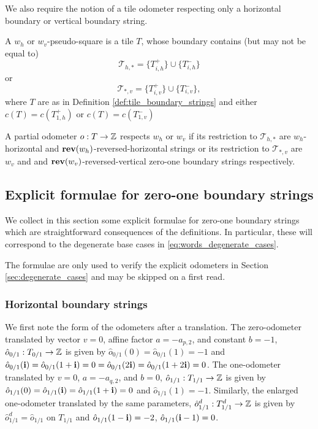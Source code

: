 \documentclass[12pt]{amsart}
\begin{document}
We also require the notion of a tile odometer respecting only a horizontal boundary or vertical boundary string.
\begin{definition} \label{def:partial_tile_boundary_strings}
	A $w_{h}$ or $w_v$-pseudo-square is a tile $T$, whose boundary contains (but may not be equal to)
	\[
	\mathcal{T}_{h,*} = \{T_{i,h}^+\} \cup \{ T_{i,h}^-\} 
	\]
	or
	\[
	 \mathcal{T}_{*,v} = \{ T_{i,v}^+\} \cup \{ T_{i,v}^-\}, 
	\]
	where $T$ are as in Definition \ref{def:tile_boundary_strings} and either $c(T) = c(T_{1,h}^+)$ or $c(T) = c(T_{1,v}^-)$
	
	A partial odometer $o: T \to \mathbb{Z}$ respects $w_{h}$ or $w_v$ 
	if its restriction to $\mathcal{T}_{h,*}$ are $w_h$-horizontal and $\mathop{\bf rev}(w_h)$-reversed-horizontal
	strings or its restriction to $\mathcal{T}_{*,v}$ are $w_v$ and and $\mathop{\bf rev}(w_v)$-reversed-vertical zero-one boundary strings respectively. 	
\end{definition}





\subsection{Explicit formulae for zero-one boundary strings} \label{subsec:bs_explicit_formulae}
We collect in this section some explicit formulae for zero-one boundary strings which are straightforward consequences
of the definitions. In particular, these will correspond
to the degenerate base cases in \eqref{eq:words_degenerate_cases}.

The formulae are only used to verify the explicit odometers in Section \ref{sec:degenerate_cases} and may be skipped on a first read.

\subsubsection{Horizontal boundary strings} \label{subsubsec:horizontal_bs_explicit}

We first note the form of the odometers after a translation. 
The zero-odometer translated by vector $v = 0$, affine factor $a = -a_{p,2}$, and constant $b = -1$,  $\hat{o}_{0/1}: T_{0/1} \to \mathbb{Z}$ is given by $\hat{o}_{0/1}(0)=\hat{o}_{0/1}(1) = -1$ and $\hat{o}_{0/1}(\mathbf{i}) = \hat{o}_{0/1}(1+ \mathbf{i}) = 0 = \hat{o}_{0/1}(2 \mathbf{i}) = \hat{o}_{0/1}(1 + 2 \mathbf{i}) = 0$.  The one-odometer translated by
$v = 0$, $a =-a_{q,2}$, and $b = 0$,  $\hat{o}_{1/1}:T_{1/1} \to \mathbb{Z}$ is given by 
$\hat{o}_{1/1}(0)=\hat{o}_{1/1}(\mathbf{i}) = \hat{o}_{1/1}(1+ \mathbf{i})=0$ and $\hat{o}_{1/1}(1) = -1$. Similarly, the enlarged one-odometer translated
by the same parameters, $\hat{o}_{1/1}^d:T_{1/1}^d \to \mathbb{Z}$ is given by $\hat{o}_{1/1}^d = \hat{o}_{1/1}$ on $T_{1/1}$ and $\hat{o}_{1/1}(1-\mathbf{i})=-2$, $\hat{o}_{1/1}(\mathbf{i}-1)=0$. 
\end{document}
